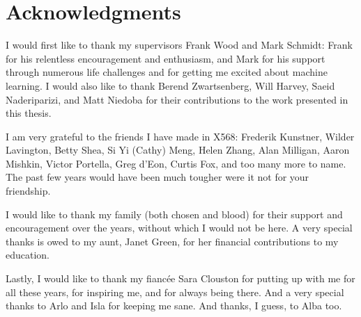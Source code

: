 
\chapter{Acknowledgments}

I would first like to thank my supervisors Frank Wood and Mark Schmidt: Frank for his relentless encouragement and enthusiasm, and Mark for his support through numerous life challenges and for getting me excited about machine learning. I would also like to thank Berend Zwartsenberg, Will Harvey, Saeid Naderiparizi, and Matt Niedoba for their contributions to the work presented in this thesis.

I am very grateful to the friends I have made in X568: Frederik Kunstner, Wilder Lavington, Betty Shea, Si Yi (Cathy) Meng, Helen Zhang, Alan Milligan, Aaron Mishkin, Victor Portella, Greg d'Eon, Curtis Fox, and too many more to name. The past few years would have been much tougher were it not for your friendship. 

I would like to thank my family (both chosen and blood) for their support and encouragement over the years, without which I would not be here. A very special thanks is owed to my aunt, Janet Green, for her financial contributions to my education. 

Lastly, I would like to thank my fiancée Sara Clouston for putting up with me for all these years, for inspiring me, and for always being there. And a very special thanks to Arlo and Isla for keeping me sane. And thanks, I guess, to Alba too.  

% 


